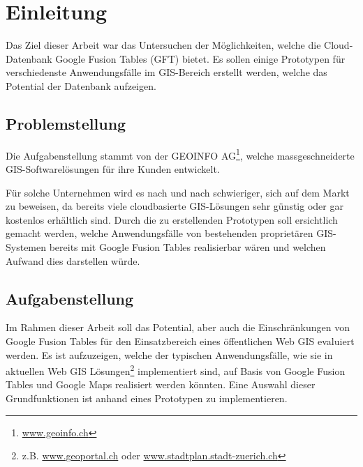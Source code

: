 \chapter{Einleitung}
\label{einleitung}
Das Ziel dieser Arbeit war das Untersuchen der Möglichkeiten, welche die \gls{Cloud}-Datenbank Google Fusion Tables (GFT) bietet. Es sollen einige Prototypen für verschiedenste Anwendungsfälle im \gls{GIS}-Bereich erstellt werden, welche das Potential der Datenbank aufzeigen.

\section{Problemstellung}
Die Aufgabenstellung stammt von der GEOINFO AG\footnote{\url{www.geoinfo.ch}}, welche massgeschneiderte \gls{GIS}-Softwarelösungen für ihre Kunden entwickelt.

Für solche Unternehmen wird es nach und nach schwieriger, sich auf dem Markt zu beweisen, da bereits viele cloudbasierte \gls{GIS}-Lösungen sehr günstig oder gar kostenlos erhältlich sind. Durch die zu erstellenden Prototypen soll ersichtlich gemacht werden, welche Anwendungsfälle von bestehenden proprietären \gls{GIS}-Systemen bereits mit Google Fusion Tables realisierbar wären und welchen Aufwand dies darstellen würde.

\section{Aufgabenstellung}
Im Rahmen dieser Arbeit soll das Potential, aber auch die Einschränkungen von Google Fusion Tables für den Einsatzbereich eines öffentlichen Web \gls{GIS} evaluiert werden. Es ist aufzuzeigen, welche der typischen Anwendungsfälle, wie sie in aktuellen Web \gls{GIS} Lösungen\footnote{z.B. \url{www.geoportal.ch} oder \url{www.stadtplan.stadt-zuerich.ch}} implementiert sind, auf Basis von Google Fusion Tables und Google Maps realisiert werden könnten. Eine Auswahl dieser Grundfunktionen ist anhand eines Prototypen zu implementieren.

